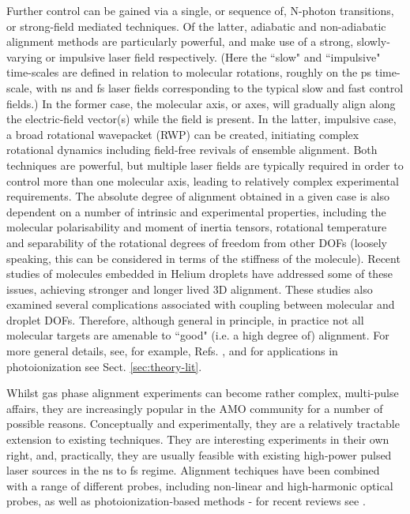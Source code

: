 \documentclass[10pt]{article}
\begin{document}
Further control can be gained via a single, or sequence of, N-photon transitions, or strong-field mediated techniques. Of the latter, adiabatic and non-adiabatic alignment methods are particularly powerful, and make use of a strong, slowly-varying or impulsive laser field respectively. (Here the ``slow" and ``impulsive" time-scales are defined in relation to molecular rotations, roughly on the ps time-scale, with ns and fs laser fields corresponding to the typical slow and fast control fields.) In the former case, the molecular axis, or axes, will gradually align along the electric-field vector(s) while the field is present. In the latter, impulsive case, a broad rotational wavepacket (RWP) can be created, initiating complex rotational dynamics including field-free revivals of ensemble alignment. Both techniques are powerful, but multiple laser fields are typically required in order to control more than one molecular axis, leading to relatively complex experimental requirements. The absolute degree of alignment obtained in a given case is also dependent on a number of intrinsic and experimental properties, including the molecular polarisability 
and moment of inertia tensors, rotational temperature and separability of the rotational degrees of freedom from other DOFs (loosely speaking, this can be considered in terms of the stiffness of the molecule). Recent studies of molecules embedded in Helium droplets have addressed some of these issues, achieving stronger and longer lived 3D alignment. These studies also examined several complications associated with coupling between molecular and droplet DOFs.   Therefore, although general in principle, in practice not all molecular targets are amenable to ``good" (i.e. a high degree of) alignment. For more general details, see, for example, Refs. \cite{koch2019QuantumControlMolecular,Stapelfeldt2003,nielsen2022Helium}, and for applications in photoionization see Sect. \ref{sec:theory-lit}.

Whilst gas phase alignment experiments can become rather complex, multi-pulse affairs, they are increasingly popular in the AMO community for a number of possible reasons. Conceptually and experimentally, they are a relatively tractable extension to existing techniques. They are interesting experiments in their own right, and, practically, they are usually feasible with existing high-power pulsed laser sources in the ns to fs regime. Alignment techiques have been combined with a range of different probes, including non-linear and high-harmonic optical probes, as well as photoionization-based methods - for recent reviews see \cite{hasegawa2015NonadiabaticMolecularAlignment,koch2019QuantumControlMolecular}. 
\end{document}
